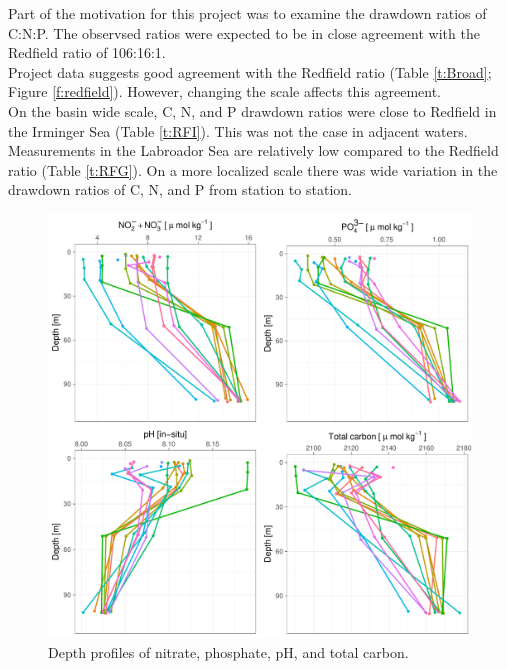 \documentclass[journal, a4paper]{article} %
\begin{document}
Part of the motivation for this project was to examine the drawdown ratios of C:N:P. The observsed ratios were expected to be in close agreement with the Redfield ratio of 106:16:1.
\\[12pt]
Project data suggests good agreement with the Redfield ratio (Table \ref{t:Broad}; Figure \ref{f:redfield}). However, changing the scale affects this agreement. 
\\[12pt]
On the basin wide scale, C, N, and P drawdown ratios were close to Redfield in the Irminger Sea (Table \ref{t:RFI}). This was not the case in adjacent waters. Measurements in the Labroador Sea are relatively low compared to the Redfield ratio (Table \ref{t:RFG}). On a more localized scale there was wide variation in the drawdown ratios of C, N, and P from station to station. 
\\[12pt]
\begin{figure}[htbp]
	\begin{center}
		\includegraphics[scale=0.35]{Depth_profiles.pdf} %
	\end{center}
	\caption[Field photo of the hydrophone array]{
	\label{f:profile}
	Depth profiles of nitrate, phosphate, pH, and total carbon.}
\end{figure}
\end{document}
